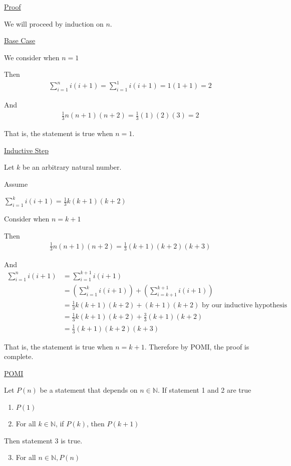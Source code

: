 \documentclass{article}
\begin{document}
\underline{Proof}

We will proceed by induction on $n$. 

\underline{Base Case}

We consider when $n=1$

Then 
\begin{align*}
    \sum_{i=1}^ni(i+1) = \sum_{i=1}^1i(i+1) = 1(1+1)=2
\end{align*}

And 
\begin{align*}
    \frac{1}{3}n(n+1)(n+2) = \frac{1}{3}(1)(2)(3) = 2
\end{align*}

That is, the statement is true when $n=1$.

\underline{Inductive Step}

Let $k$ be an arbitrary natural number. 

Assume 

$\sum_{i=1}^ki(i+1) = \frac{1}{3}k(k+1)(k+2)$

Consider when $n = k+1$

Then 
\begin{align*}
    \frac{1}{3}n(n+1)(n+2) = \frac{1}{3}(k+1)(k+2)(k+3)
\end{align*}

And
\begin{align*}
    \sum_{i=1}^ni(i+1) &= \sum_{i=1}^{k+1}i(i+1) \\
    &= (\sum_{i=1}^ki(i+1)) + (\sum_{i=k+1}^{k+1}i(i+1)) \\
    &= \frac{1}{3}k(k+1)(k+2) + (k+1)(k+2) \text{ by our inductive hypothesis} \\
    &= \frac{1}{3}k(k+1)(k+2) + \frac{3}{3}(k+1)(k+2) \\
    &= \frac{1}{3}(k+1)(k+2)(k+3)
\end{align*}

That is, the statement is true when $n = k+1$. Therefore by POMI, the proof is complete.

\underline{POMI}

Let $P(n)$ be a statement that depends on $n \in \mathbb{N}$. If statement 1 and 2 are true
\begin{enumerate}
    \item $P(1)$
    \item For all $k \in \mathbb{N}$, if $P(k)$, then $P(k+1)$
\end{enumerate}
Then statement 3 is true.
\begin{enumerate}
    \setcounter{enumi}{2}
    \item For all $n \in \mathbb{N}, P(n)$
\end{enumerate}
\end{document}
